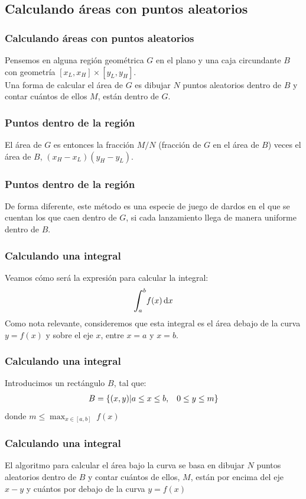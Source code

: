 \documentclass[12pt]{beamer}
\begin{document}
\subsection{Calculando áreas con puntos aleatorios}

\begin{frame}
\frametitle{Calculando áreas con puntos aleatorios}
Pensemos en alguna región geométrica $G$ en el plano y una caja circundante $B$ con geometría $[x_{L}, x_{H}] \times [y_{L}, y_{H}]$.
\\
\bigskip
Una forma de calcular el área de $G$ es dibujar $N$ puntos aleatorios dentro de $B$ y contar cuántos de ellos $M$, están dentro de $G$.
\end{frame}
\begin{frame}
\frametitle{Puntos dentro de la región}
El área de $G$ es entonces la fracción $M/N$ (fracción de $G$ en el área de $B$) veces el área de $B$, $(x_{H} - x_{L})(y_{H} - y_{L})$.
\end{frame}
\begin{frame}
\frametitle{Puntos dentro de la región}
De forma diferente, este método es una especie de juego de dardos en el que se cuentan los que caen dentro de $G$, si cada lanzamiento llega de manera uniforme dentro de $B$.
\end{frame}
\begin{frame}
\frametitle{Calculando una integral}
Veamos cómo será la expresión para calcular la integral:
\pause
\begin{align*}
\scaleint{6ex}_{\bs a}^{b} f (x) \dd{x}
\end{align*}
Como nota relevante, consideremos que esta integral es el área debajo de la curva $y = f(x)$ y sobre el eje $x$, entre $x = a$ y $x = b$.
\end{frame}
\begin{frame}
\frametitle{Calculando una integral}
Introducimos un rectángulo $B$, tal que:
\pause
\begin{align*}
B = \{ (x, y) \vert a \leq x \leq b, \hspace{0.3cm} 0 \leq y \leq m \}
\end{align*}
donde $m \leq \max_{x \in [a, b]} \; f(x)$
\end{frame}
\begin{frame}
\frametitle{Calculando una integral}
El algoritmo para calcular el área bajo la curva se basa en dibujar $N$ puntos aleatorios dentro de $B$ y contar cuántos de ellos, $M$, están por encima del eje $x-y$  y cuántos por debajo de la curva $y = f (x)$
\end{frame}
\end{document}
